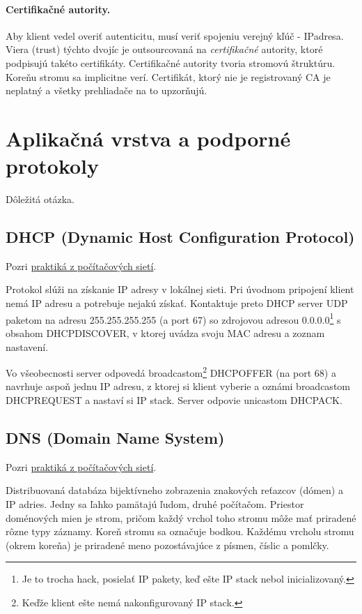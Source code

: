 \documentclass[10pt,a4paper]{article}
\begin{document}
\paragraph{Certifikačné autority.}
Aby klient vedel overiť autenticitu, musí veriť spojeniu verejný kľúč - IPadresa. 
Viera (trust) týchto dvojíc je outsourcovaná na \emph{certifikačné} autority,
ktoré podpisujú takéto certifikáty. Certifikačné autority tvoria stromovú štruktúru. Koreňu stromu sa implicitne verí. 
Certifikát, ktorý nie je registrovaný CA je neplatný a všetky prehliadače na to upzorňujú. 
            
\section{Aplikačná vrstva a podporné protokoly}     
Dôležitá otázka.   


\subsection{DHCP (Dynamic Host Configuration Protocol)} 
Pozri \href{http://netlab.dcs.fmph.uniba.sk/siete/cviko4/}{praktiká z počítačových sietí}. 
  
Protokol slúži na získanie IP adresy v lokálnej sieti. 
Pri úvodnom pripojení klient nemá IP adresu a potrebuje nejakú získať. Kontaktuje preto DHCP server UDP paketom na adresu 255.255.255.255 (a port 67) so zdrojovou adresou 0.0.0.0\footnote{
Je to trocha hack, posielať IP pakety, keď ešte IP stack nebol inicializovaný.
} s obsahom DHCPDISCOVER, v ktorej uvádza svoju MAC adresu a zoznam nastavení. 

Vo všeobecnosti server odpovedá broadcastom\footnote{
Keďže klient ešte nemá nakonfigurovaný IP stack. 
} DHCPOFFER (na port 68) a navrhuje aspoň jednu IP adresu, z ktorej si klient vyberie a oznámi broadcastom DHCPREQUEST a nastaví si IP stack. Server odpovie unicastom DHCPACK.
  
\subsection{DNS (Domain Name System)}   
Pozri \href{http://netlab.dcs.fmph.uniba.sk/siete/cviko4/}{praktiká z počítačových sietí}. 

Distribuovaná databáza bijektívneho zobrazenia znakových reťazcov (dómen) a IP adries. Jedny sa ľahko pamätajú ľudom, druhé počítačom. Priestor doménových mien je strom, pričom každý vrchol toho stromu môže mať priradené rôzne typy záznamy. Koreň stromu sa označuje bodkou. Každému vrcholu stromu (okrem koreňa) je priradené meno pozostávajúce z písmen, číslic a pomlčky.
\end{document}
